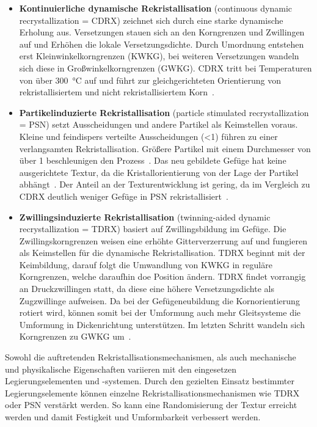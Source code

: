 \begin{itemize}
    \item \textbf{Kontinuierliche dynamische Rekristallisation} (continuous dynamic recrystallization = CDRX) zeichnet sich durch eine starke dynamische Erholung aus.
    Versetzungen stauen sich an den Korngrenzen und Zwillingen auf und Erhöhen die lokale Versetzungsdichte.
    Durch Umordnung entstehen erst Kleinwinkelkorngrenzen (KWKG), bei weiteren Versetzungen wandeln sich diese in Großwinkelkorngrenzen (GWKG).
    CDRX tritt bei Temperaturen von über \SI{300}{\degreeCelsius} auf und führt zur gleichgerichteten Orientierung von rekristallisiertem und nicht rekristallisiertem Korn~\cite{NarayanaMurty.2015}.
    \item \textbf{Partikelinduzierte Rekristallisation} (particle stimulated recrystallization = PSN) setzt Ausscheidungen und andere Partikel als Keimstellen voraus.
    Kleine und feindispers verteilte Ausscheidungen (<\SI{1}{\mum}) führen zu einer verlangsamten Rekristallisation.
    Größere Partikel mit einem Durchmesser von über \SI{1}{\mum} beschleunigen den Prozess~\cite{Kittner.2019}.
    Das neu gebildete Gefüge hat keine ausgerichtete Textur, da die Kristallorientierung von der Lage der Partikel abhängt~\cite{Ullmann2019}.
    Der Anteil an der Texturentwicklung ist gering, da im Vergleich zu CDRX deutlich weniger Gefüge in PSN rekristallisiert~\cite{Ullmann2014}.
    \item \textbf{Zwillingsinduzierte Rekristallisation} (twinning-aided dynamic recrystallization = TDRX) basiert auf Zwillingsbildung im Gefüge.
    Die Zwillingskorngrenzen weisen eine erhöhte Gitterverzerrung auf und fungieren als Keimstellen für die dynamische Rekristallisation.
    TDRX beginnt mit der Keimbildung, darauf folgt die Umwandlung von KWKG in reguläre Korngrenzen, welche daraufhin doe Position ändern.
    TDRX findet vorrangig an Druckzwillingen statt, da diese eine höhere Versetzungsdichte als Zugzwillinge aufweisen.
    Da bei der Gefügeneubildung die Kornorientierung rotiert wird, können somit bei der Umformung auch mehr Gleitsysteme die Umformung in Dickenrichtung unterstützen.
    Im letzten Schritt wandeln sich Korngrenzen zu GWKG um~\cite{Kittner.2019}.
\end{itemize}

Sowohl die auftretenden Rekristallisationsmechanismen, als auch mechanische und physikalische Eigenschaften variieren mit den eingesetzen Legierungselementen und -systemen.
Durch den gezielten Einsatz bestimmter Legierungselemente können einzelne Rekristallisationsmechanismen wie TDRX oder PSN verstärkt werden.
So kann eine Randomisierung der Textur erreicht werden und damit Festigkeit und Umformbarkeit verbessert werden.

